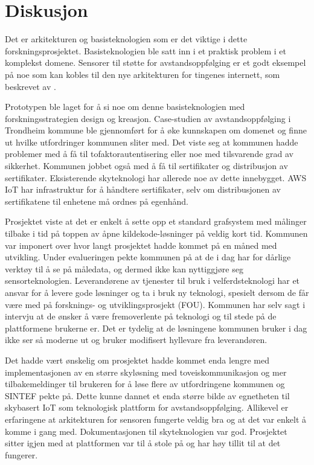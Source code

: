 \chapter{Diskusjon}
\label{ch:discussion}

Det er arkitekturen og basisteknologien som er det viktige i dette forskningsprosjektet. Basisteknologien
ble satt inn i et praktisk problem i et komplekst domene. Sensorer til støtte for avstandsoppfølging er et
godt eksempel på noe som kan kobles til den nye arkitekturen for tingenes internett, som beskrevet av \citet{iot_harvard_smart}.

Prototypen ble laget
for å si noe om denne basisteknologien med forskningsstrategien design og kreasjon. Case-studien av avstandsoppfølging
i Trondheim kommune ble gjennomført for å øke kunnskapen om domenet og finne ut hvilke utfordringer kommunen sliter med.
Det viste seg at kommunen hadde problemer med å få til tofaktorautentisering eller noe med tilsvarende grad av sikkerhet. Kommunen
jobbet også med å få til sertifikater og distribusjon av sertifikater. Eksisterende skyteknologi har allerede noe av dette innebygget.
AWS IoT har infrastruktur for å håndtere sertifikater, selv om distribusjonen av sertifikatene
til enhetene må ordnes på egenhånd.

Prosjektet viste at det er enkelt å sette opp et standard grafsystem med målinger tilbake i tid på toppen av åpne kildekode-løsninger
på veldig kort tid. Kommunen var imponert over hvor langt prosjektet hadde kommet på en måned med utvikling.
Under evalueringen pekte kommunen på at de i dag har for dårlige verktøy til å se på måledata, og dermed
ikke kan nyttiggjøre seg sensorteknologien. Leverandørene av tjenester til bruk i velferdsteknologi har et ansvar for
å levere gode løsninger og ta i bruk ny teknologi, spesielt dersom de får være med på forsknings- og utviklingsprosjekt (FOU). Kommunen
har selv sagt i intervju at de ønsker å være fremoverlente på teknologi og til stede på de plattformene brukerne er.
Det er tydelig at de løsningene kommunen bruker i dag
ikke ser så moderne ut og bruker modifisert hyllevare fra leverandøren.

Det hadde vært ønskelig om prosjektet hadde kommet enda lengre med implementasjonen av en større skyløsning med
toveiskommunikasjon og mer tilbakemeldinger til brukeren for å løse flere av utfordringene kommunen og SINTEF pekte på.
Dette kunne dannet et enda større bilde av egnetheten
til skybasert IoT som teknologisk plattform for avstandsoppfølging. Allikevel er erfaringene at arkitekturen for sensoren fungerte
veldig bra og at det var enkelt å komme i gang med. Dokumentasjonen til skyteknologien var god. Prosjektet sitter igjen med at
plattformen var til å stole på og har høy tillit til at det fungerer.

